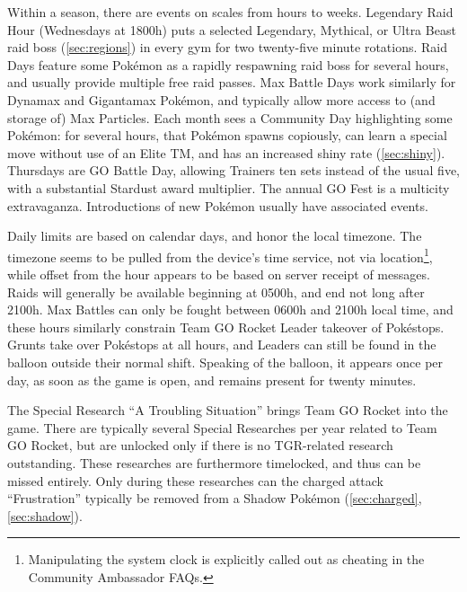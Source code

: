 Within a season, there are events on scales from hours to weeks.
Legendary Raid Hour (Wednesdays at 1800h) puts a selected Legendary, Mythical,
 or Ultra Beast raid boss (\autoref{sec:regions}) in every gym for two
 twenty-five minute rotations.
Raid Days feature some Pokémon as a rapidly respawning raid boss for several hours,
 and usually provide multiple free raid passes.
Max Battle Days work similarly for Dynamax and Gigantamax Pokémon, and typically
 allow more access to (and storage of) Max Particles.
Each month sees a Community Day highlighting some Pokémon: for several hours,
 that Pokémon spawns copiously, can learn a special move without use of an
 Elite TM, and has an increased shiny rate (\autoref{sec:shiny}).
Thursdays are GO Battle Day, allowing Trainers ten sets instead of the usual five, with a substantial Stardust award multiplier.
The annual GO Fest is a multicity extravaganza.
Introductions of new Pokémon usually have associated events.

Daily limits are based on calendar days, and honor the local timezone.
The timezone seems to be pulled from the device's time service, not via location\footnote{Manipulating
 the system clock is explicitly called out as cheating in the Community Ambassador FAQs.},
 while offset from the hour appears to be based on server receipt of messages.
Raids will generally be available beginning at 0500h, and end not long after 2100h.
Max Battles can only be fought between 0600h and 2100h local time,
 and these hours similarly constrain Team GO Rocket Leader takeover of Pokéstops.
Grunts take over Pokéstops at all hours, and Leaders can still be found
 in the balloon outside their normal shift.
Speaking of the balloon, it appears once per day, as soon as the game is open, and remains present for twenty minutes.

The Special Research ``A Troubling Situation'' brings Team GO Rocket into the game.
There are typically several Special Researches per year related to Team GO Rocket,
 but are unlocked only if there is no TGR-related research outstanding.
These researches are furthermore timelocked, and thus can be missed entirely.
Only during these researches can the charged attack ``Frustration'' typically be removed
 from a Shadow Pokémon (\autoref{sec:charged}, \autoref{sec:shadow}).
